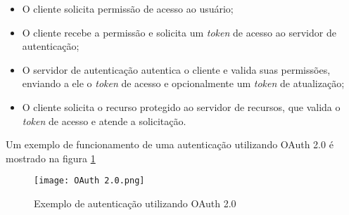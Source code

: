 \begin{itemize}
\item O cliente solicita permissão de acesso ao usuário;
\item O cliente recebe a permissão e solicita um \emph{token} de acesso ao servidor de autenticação;
\item O servidor de autenticação autentica o cliente e valida suas permissões, enviando a ele o 
\emph{token} de acesso e opcionalmente um \emph{token} de atualização;
\item O cliente solicita o recurso protegido ao servidor de recursos, que valida o \emph{token} de 
acesso e atende a solicitação.
\end{itemize}

Um exemplo de funcionamento de uma autenticação utilizando OAuth 2.0 é mostrado na figura 
\ref{fig:OAuth2}

\begin{figure}[ht]
    \centering
    \texttt{[image: OAuth 2.0.png]}
    \caption{Exemplo de autenticação utilizando OAuth 2.0}
    \label{fig:OAuth2}
\end{figure}
